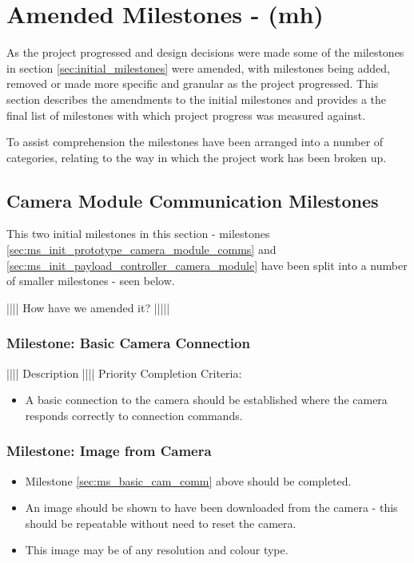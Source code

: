 
\section{Amended Milestones - (mh)}
\label{sec:amended_milestones}
As the project progressed and design decisions were made some of the milestones in section
\ref{sec:initial_milestones} were amended, with milestones being added, removed or made more
specific and granular as the project progressed. This section describes the amendments to the
initial milestones and provides a the final list of milestones with which project progress was measured
against.

To assist comprehension the milestones have been arranged into a number of categories,
relating to the way in which the project work has been broken up. 

\subsection{Camera Module Communication Milestones}
This two initial milestones in this section - milestones \ref{sec:ms_init_prototype_camera_module_comms}
and \ref{sec:ms_init_payload_controller_camera_module}  have been split into a number of smaller
milestones - seen below.

|||| How have we amended it? |||||

	\subsubsection{Milestone: Basic Camera Connection}
		|||| Description ||||
		Priority
		Completion Criteria:
		\label{sec:ms_basic_cam_comm}
		\begin{itemize}
			\item 	A basic connection to the camera should be established
				where the camera responds correctly to connection 
				commands.
		\end{itemize}
	
	\subsubsection{Milestone: Image from Camera}
		\label{sec:ms_img_from_cam}
		\begin{itemize}
			\item 	Milestone \ref{sec:ms_basic_cam_comm} above should
				be completed.
			\item 	An image should be shown to have been downloaded 
				from the camera - this should be repeatable without
				need to reset the camera.
			\item 	This image may be of any resolution and colour type.
		\end{itemize} 

